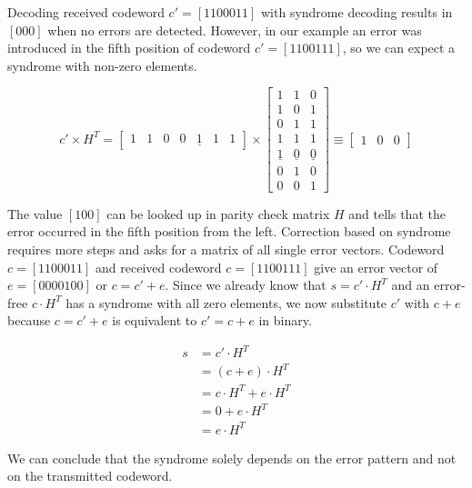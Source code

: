 \documentclass[../main.tex]{subfiles}
\begin{document}
    \noindent
    Decoding received codeword $c'=[1100011]$ with syndrome decoding results in $[000]$ when no errors are detected. However, in our example an error was introduced in the fifth position of codeword $c'=[1100111]$, so we can expect a syndrome with non-zero elements.

    \begin{equation*}
        c' \times H^T =
        \begin{bmatrix}
            1&1&0&0&\underline{1}&1&1
        \end{bmatrix}
        \times
        \begin{bmatrix}
            1&1&0\\
            1&0&1\\
            0&1&1\\
            1&1&1\\
            \underline{1}&\underline{0}&\underline{0}\\
            0&1&0\\
            0&0&1
        \end{bmatrix}
        \equiv
        \begin{bmatrix}
            1&0&0
        \end{bmatrix}
    \end{equation*}

    \noindent
    The value $[100]$ can be looked up in parity check matrix $H$ and tells that the error occurred in the fifth position from the left. Correction based on syndrome requires more steps and asks for a matrix of all single error vectors. Codeword $c=[1100011]$ and received codeword $c=[1100111]$ give an error vector of $e=[0000100]$ or $c=c'+e$. Since we already know that $s=c' \cdot H^T$ and an error-free $c \cdot H^T$ has a syndrome with all zero elements, we now substitute $c'$ with $c+e$ because $c=c'+e$ is equivalent to $c'=c+e$ in binary.

    \begin{align*}
        s &= c' \cdot H^T\\
          &= (c+e) \cdot H^T\\
          &= c \cdot H^T + e \cdot H^T\\
          &= 0 + e \cdot H^T\\
          &= e \cdot H^T
    \end{align*}

    \noindent
    We can conclude that the syndrome solely depends on the error pattern and not on the transmitted codeword.
\end{document}
